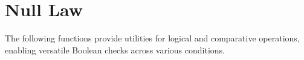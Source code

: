 \section{Null Law}
\label{Null Law}
\begin{NexMainBox}
	\begin{NexMainBox}
		The following functions provide utilities for logical and comparative operations, enabling versatile Boolean checks across various conditions.
	\end{NexMainBox}
	\begin{NexMainBox}
		\begin{NexListDark}
		\end{NexListDark}
	\end{NexMainBox}
\end{NexMainBox}
\begin{comment}
\begin{NexMainBox}[light, hdrA, sdwA, crnA, grwB, secB]
	\begin{NexMainBox}[dark, crnA]
		\begin{NexListDark}
			\NexItemDark{\NexFunction{INEQ__(B1, B2, B3)}: Logical NOT of \NexFunction{IEQ__}.}
			\NexItemDark{\NexFunction{GT__(B1, B2, B3)}: Returns \texttt{true} if \texttt{B1} is greater than \texttt{B2}.}
			\NexItemDark{\NexFunction{LT__(B1, B2, B3)}: Returns \texttt{true} if \texttt{B1} is less than \texttt{B2}.}
			\NexItemDark{\NexFunction{LE__(B1, B2, B3)}: Returns \texttt{true} if \texttt{B1} is less than or equal to \texttt{B2}.}
			\NexItemDark{\NexFunction{GE__(B1, B2, B3)}: Returns \texttt{true} if \texttt{B1} is greater than or equal to \texttt{B2}.}
			\NexItemDark{\NexFunction{IN__(V, D, B)}: Determines if \texttt{D} is an element of array \texttt{V} and satisfies \NexFunction{TRUE__}.}
			\NexItemDark{\NexFunction{ORFT__(B1, B2, B3)}: Returns true if \texttt{B1} is false or \texttt{B2} is true, based on \texttt{B3}.}
		\end{NexListDark}
    \end{NexMainBox}
\end{NexMainBox}

		\bftext{Expression:}\smallskip\\

		$ A + 1 = 1 $\\
		 $ A \cdot 0 = 0 $\\

		\bftext{Explanation:} For the Null Law of OR (addition), if $A$ is 1 and you add 1, the result is 1, not 0.
		This is because in Boolean algebra, the OR operation is defined such that any variable OR-ed with 1 results in 1.
		It’s like saying if either condition is true, the outcome is true regardless of the other condition.\smallskip
	\end{Items}
\end{ColorThemedBox}
\smallskip\\
\end{comment}
